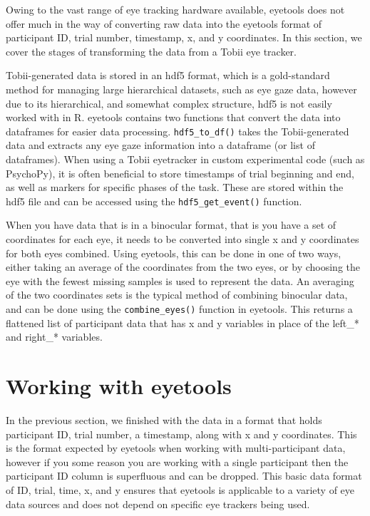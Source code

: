 \documentclass[
  man,
  floatsintext,
  longtable,
  nolmodern,
  notxfonts,
  notimes,
  colorlinks=true,linkcolor=blue,citecolor=blue,urlcolor=blue]{apa7}
\begin{document}
Owing to the vast range of eye tracking hardware available, eyetools
does not offer much in the way of converting raw data into the eyetools
format of participant ID, trial number, timestamp, x, and y coordinates.
In this section, we cover the stages of transforming the data from a
Tobii eye tracker.

Tobii-generated data is stored in an hdf5 format, which is a
gold-standard method for managing large hierarchical datasets, such as
eye gaze data, however due to its hierarchical, and somewhat complex
structure, hdf5 is not easily worked with in R. eyetools contains two
functions that convert the data into dataframes for easier data
processing. \texttt{hdf5\_to\_df()} takes the Tobii-generated data and
extracts any eye gaze information into a dataframe (or list of
dataframes). When using a Tobii eyetracker in custom experimental code
(such as PsychoPy), it is often beneficial to store timestamps of trial
beginning and end, as well as markers for specific phases of the task.
These are stored within the hdf5 file and can be accessed using the
\texttt{hdf5\_get\_event()} function.

When you have data that is in a binocular format, that is you have a set
of coordinates for each eye, it needs to be converted into single x and
y coordinates for both eyes combined. Using eyetools, this can be done
in one of two ways, either taking an average of the coordinates from the
two eyes, or by choosing the eye with the fewest missing samples is used
to represent the data. An averaging of the two coordinates sets is the
typical method of combining binocular data, and can be done using the
\texttt{combine\_eyes()} function in eyetools. This returns a flattened
list of participant data that has x and y variables in place of the
left\_* and right\_* variables.

\section{Working with eyetools}\label{working-with-eyetools}

In the previous section, we finished with the data in a format that
holds participant ID, trial number, a timestamp, along with x and y
coordinates. This is the format expected by eyetools when working with
multi-participant data, however if you some reason you are working with
a single participant then the participant ID column is superfluous and
can be dropped. This basic data format of ID, trial, time, x, and y
ensures that eyetools is applicable to a variety of eye data sources and
does not depend on specific eye trackers being used.
\end{document}

